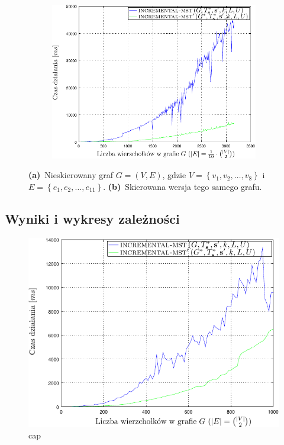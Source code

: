 \begin{figure}[!htbp]
\begin{subfigure}[b]{0.32\textwidth}
		\includegraphics[width=\textwidth]{Chapter_VI/IMST3-example/IMST3_psfrag}
		\caption{}
		\label{fig:a:c}
	\end{subfigure}
	\hfill\null
	\caption{
		\textbf{(a)}~Nieskierowany graf $G = \left( V, E \right)$, gdzie $V = \left\{ v_{1}, v_{2}, \dots, v_{8} \right\}$ i $E = \left\{ e_{1}, e_{2}, \dots, e_{11} \right\}$.
		\textbf{(b)}~Skierowana wersja tego samego grafu.
	}
	\label{fig:a}
\end{figure}


\subsection{Wyniki i wykresy zależności}


\begin{figure}[!htbp]
	\includegraphics[width=\textwidth]{Chapter_VI/IMST1-example/IMST1_psfrag}
	\caption{
		cap
	}
	\label{fig:tabusearchGreedy}
\end{figure}
